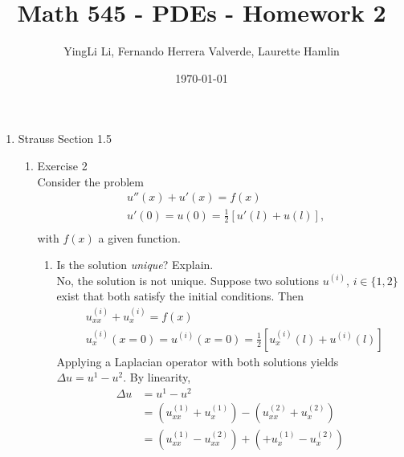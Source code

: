 \documentclass[12pt]{article}%
\begin{document}
\title{Math 545 - PDEs - Homework 2}
\author{YingLi Li, Fernando Herrera Valverde, Laurette Hamlin}
\date{\today}
\maketitle

\begin{enumerate}
    \item Strauss Section 1.5 \smallskip
    \begin{enumerate}
        \item Exercise 2 \smallskip \\
        Consider the problem
        \begin{align*}
            &u''\left(x\right) + u'\left(x\right) = f\left(x\right) \\
            &u'\left(0\right)=u\left(0\right)=\frac{1}{2}\left[ u'\left(l\right) + u\left(l\right) \right] \text{,} \\
        \end{align*} 
        with $f\left(x\right)$ a given function.
        \begin{enumerate}
            \item Is the solution \emph{unique}? Explain. \\
                No, the solution is not unique. Suppose two solutions $u^{\left(i\right)}$, $i \in \{1,2\}$ exist that both satisfy the initial conditions.  Then 
                \begin{align*}
                    &u^{\left(i\right)}_{xx} + u^{\left(i\right)}_{x} = f\left(x\right) \\
                    &u^{\left(i\right)}_{x}\left(x=0\right)=u^{\left(i\right)}\left(x=0\right)=\frac{1}{2}\left[ u^{\left(i\right)}_{x}\left(l\right) + u^{\left(i\right)}\left(l\right) \right]
                \end{align*}
                Applying a Laplacian operator with both solutions yields $\Delta u = u^1 - u^2$. By linearity,
                \begin{align*}
                    \Delta u &= u^1 - u^2 \\
                    &= \left(u^{\left(1\right)}_{xx} + u^{\left(1\right)}_{x}\right)
                    - \left( u^{\left(2\right)}_{xx} + u^{\left(2\right)}_{x}\right) \\
                    &= \left(u^{\left(1\right)}_{xx} - u^{\left(2\right)}_{xx}\right)
                    + \left(+ u^{\left(1\right)}_{x} - u^{\left(2\right)}_{x}\right) \\ 

\end{align*}
\end{enumerate}
\end{enumerate}
\end{enumerate}
\end{document}

